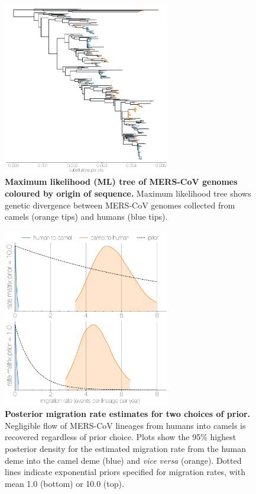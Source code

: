 \documentclass[11pt,oneside,letterpaper]{article}
\begin{document}
\begin{figure}[h]
\centering
	\includegraphics[width=0.65\textwidth]{figures/mers_ML.png}
	\caption{\textbf{Maximum likelihood (ML) tree of MERS-CoV genomes coloured by origin of sequence.}
Maximum likelihood tree shows genetic divergence between MERS-CoV genomes collected from camels (orange tips) and humans (blue tips).
	}
	\label{ml}
\end{figure}

\begin{figure}[h]
\centering
	\includegraphics[width=0.65\textwidth]{figures/mers_prior.png}
	\caption{\textbf{Posterior migration rate estimates for two choices of prior.}
Negligible flow of MERS-CoV lineages from humans into camels is recovered regardless of prior choice.
Plots show the 95\% highest posterior density for the estimated migration rate from the human deme into the camel deme (blue) and \textit{vice versa} (orange).
Dotted lines indicate exponential priors specified for migration rates, with mean 1.0 (bottom) or 10.0 (top).
	}
	\label{prior}
\end{figure}
\end{document}
